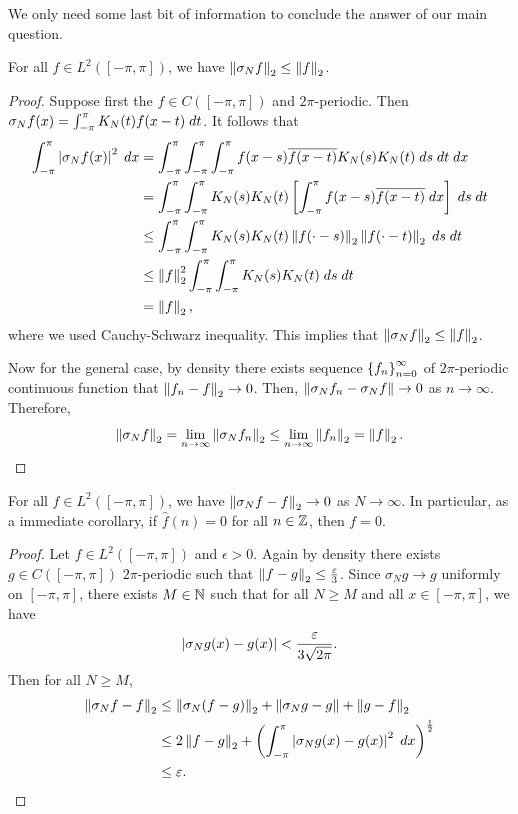 \documentclass[a4paper]{article}
\begin{document}
We only need some last bit of information to conclude 
the answer of our main question.

\begin{thm}
For all $f \in L^2([-\pi, \pi])$, we have 
$\left\lVert \sigma_N f\right\rVert_2 \leq \left\lVert f\right\rVert_2$.
\end{thm}

\begin{proof}
Suppose first the $f \in C([-\pi, \pi])$ and $2\pi$-periodic.
Then $\sigma_N f(x) = \int_{-\pi}^{\pi} K_N(t) f(x - t) \; d t$.
It follows that 
\[
\begin{aligned}
  \int_{-\pi}^\pi \left\lvert \sigma_N f(x)\right\rvert^2 \; d x
  &= \int_{-\pi}^\pi \int_{-\pi}^{\pi}
  \int_{-\pi}^{\pi} f(x - s) \overline{f(x - t)} K_N(s) K_N(t) 
  \; d s \; d t \; d x \\
  &= \int_{-\pi}^{\pi} \int_{-\pi}^{\pi} K_N(s) 
  K_N(t) \left[ \int_{-\pi}^{\pi} f(x - s) 
  \overline{f(x - t)} \; d x \right] \; d s \; d t \\
  &\leq \int_{-\pi}^{\pi} \int_{-\pi}^{\pi} 
  K_N(s) K_N(t) \left\lVert f(\cdot - s)\right\rVert_2 \left\lVert f(\cdot - t)\right\rVert_2 
  \; d s \; d t \\
  &\leq \left\lVert f\right\rVert_2^2 \int_{-\pi}^{\pi} \int_{-\pi}^{\pi} 
  K_N(s) K_N(t) \; d s \; d t \\
  &= \left\lVert f\right\rVert_2,
\end{aligned}
\]
where we used Cauchy-Schwarz inequality. 
This implies that $\left\lVert \sigma_N f\right\rVert_2 \leq \left\lVert f\right\rVert_2$.

Now for the general case, by density there exists 
sequence $\left\{ f_n \right\}_{n=0}^\infty$ of $2\pi$-periodic continuous 
function that $\left\lVert f_n - f\right\rVert_2 \to 0$. Then, 
$\left\lVert \sigma_N f_n - \sigma_N f\right\rVert \to 0$
as $n \to \infty$. Therefore, 
\[
\left\lVert \sigma_N f\right\rVert_2 = \lim_{n \to \infty} \left\lVert \sigma_N f_n\right\rVert_2 
\leq \lim_{n \to \infty} \left\lVert f_n\right\rVert_2 = \left\lVert f\right\rVert_2.
\]
\end{proof}

\begin{thm}
For all $f \in L^2([-\pi, \pi])$, we have 
$\left\lVert \sigma_N f - f\right\rVert_2 \to 0$ as $N \to \infty$. 
In particular, as a immediate corollary, 
if $\hat{f}(n) = 0$ for all $n \in \mathbb{Z}$, 
then $f = 0$.
\end{thm}

\begin{proof}
Let $f \in L^2([-\pi, \pi])$ and $\epsilon > 0$. 
Again by density there exists $g \in C([-\pi, \pi])$
$2\pi$-periodic such that $\left\lVert f - g\right\rVert_2 \leq
\frac{\varepsilon}{3}$. Since $\sigma_N g \to g$ uniformly
on $[-\pi, \pi]$, there exists $M \in \mathbb{N}$ such that 
for all $N \geq M$ and all $x \in [-\pi, \pi]$, we have 
\[
\left\lvert \sigma_N g(x) - g(x)\right\rvert < \frac{\varepsilon}{3 \sqrt{2 \pi}}.
\]
Then for all $N \geq M$, 
\[
\begin{aligned}
\left\lVert \sigma_N f - f\right\rVert_2 
&\leq \left\lVert \sigma_N (f - g)\right\rVert_2 + \left\lVert \sigma_N g - g\right\rVert 
+ \left\lVert g - f\right\rVert_2 \\
&\leq 2 \left\lVert f - g\right\rVert_2 + \left( \int_{-\pi}^{\pi} \left\lvert \sigma_N g(x)
- g(x)\right\rvert^2 \; d x \right)^{\frac{1}{2}} \\
&\leq \varepsilon.
\end{aligned}
\]
\end{proof}
\end{document}
